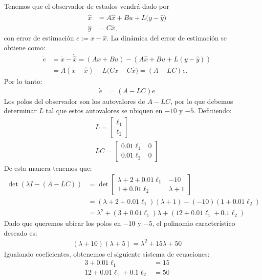 \documentclass[
  11pt,
  letterpaper,
   addpoints,
  answers
  ]{exam}
\begin{document}
\begin{solution}
Tenemos que el observador de estados vendrá dado por
\begin{align}
\dot{\hat x} &= A\hat x + Bu + L\big(y-\hat y\big)\\
\hat y &= C\hat x,
\end{align}
con error de estimación $e:=x-\hat x$. La dinámica del error de estimación se obtiene como:
\begin{align}
\dot e
&= \dot x - \dot{\hat x}
= (Ax+Bu) - (A\hat x + Bu + L(y-\hat y)) \\
&= A(x-\hat x) - L\big(Cx - C\hat x\big)
= (A-LC)e. \label{eq:error_dyn}
\end{align}
Por lo tanto:
\begin{align}
\dot e &= (A-LC)e
\end{align}
Los polos del observador son los autovalores de $A-LC$, por lo que debemos determinar $L$ tal que estos autovalores se ubiquen en $-10$ y $-5$. Definiendo:
\begin{align}
  L= \begin{bmatrix} \ell_1 \\ \ell_2 \end{bmatrix}\\
  LC = \begin{bmatrix} 0.01\ell_1 & 0 \\ 0.01\ell_2 & 0 \end{bmatrix}
\end{align}
De esta manera tenemos que:
\begin{align}
  \det(\lambda I - (A-LC)) &= \det\begin{bmatrix} \lambda + 2 + 0.01\ell_1 & -10 \\ 1 + 0.01\ell_2 & \lambda + 1 \end{bmatrix} \\
  &= (\lambda + 2 + 0.01\ell_1)(\lambda + 1) - (-10)(1 + 0.01\ell_2) \\
  &= \lambda^2 + (3 + 0.01\ell_1)\lambda + (12 + 0.01\ell_1 + 0.1\ell_2)
\end{align}
Dado que queremos ubicar los polos en $-10$ y $-5$, el polinomio característico deseado es:
\begin{align}
  (\lambda + 10)(\lambda + 5) = \lambda^2 + 15\lambda + 50
\end{align}
Igualando coeficientes, obtenemos el siguiente sistema de ecuaciones:
\begin{align}
  3 + 0.01\ell_1 &= 15 \\
  12 + 0.01\ell_1 + 0.1\ell_2 &= 50
\end{align}

\end{solution}
\end{document}
